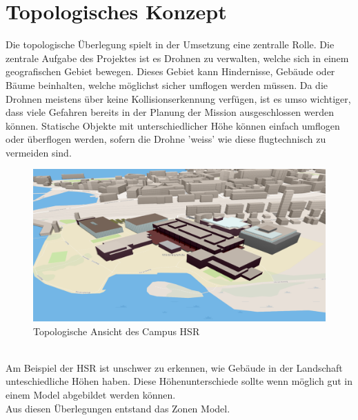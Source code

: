 \newpage
\section{Topologisches Konzept}
Die topologische Überlegung spielt in der Umsetzung eine zentralle Rolle. Die zentrale Aufgabe des Projektes ist es Drohnen zu verwalten, welche sich in einem geografischen Gebiet bewegen. Dieses Gebiet kann Hindernisse, Gebäude oder Bäume beinhalten, welche möglichst sicher umflogen werden müssen. Da die Drohnen meistens über keine Kollisionserkennung verfügen, ist es umso wichtiger, dass viele Gefahren bereits in der Planung der Mission ausgeschlossen werden können. Statische Objekte mit unterschiedlicher Höhe können einfach umflogen oder überflogen werden, sofern die Drohne 'weiss' wie diese flugtechnisch zu vermeiden sind. \\
\begin{figure}[h]
	\includegraphics[width=1.0\textwidth]{images/routing/topology_example.png}
	\caption{Topologische Ansicht des Campus HSR}
	\label{fig:campus-hsr}
\end{figure}
\\
Am Beispiel der HSR ist unschwer zu erkennen, wie Gebäude in der Landschaft unteschiedliche Höhen haben. Diese Höhenunterschiede sollte wenn möglich gut in einem Model abgebildet werden können. \\
Aus diesen Überlegungen entstand das Zonen Model.
